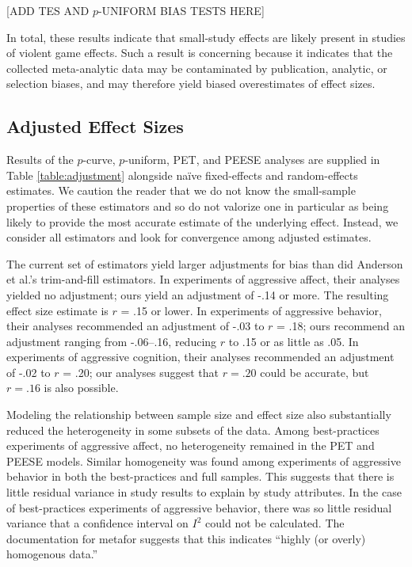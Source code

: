 \documentclass[man, mask]{apa6}
\begin{document}
[ADD TES AND $p$-UNIFORM BIAS TESTS HERE]

In total, these results indicate that small-study effects are likely present in studies of violent game effects. Such a result is concerning because it indicates that the collected meta-analytic data may be contaminated by publication, analytic, or selection biases, and may therefore yield biased overestimates of effect sizes.

\subsection{Adjusted Effect Sizes}
Results of the $p$-curve, $p$-uniform, PET, and PEESE analyses are supplied in Table \ref{table:adjustment} alongside na{\"i}ve fixed-effects and random-effects estimates. We caution the reader that we do not know the small-sample properties of these estimators and so do not valorize one in particular as being likely to provide the most accurate estimate of the underlying effect. Instead, we consider all estimators and look for convergence among adjusted estimates.

The current set of estimators yield larger adjustments for bias than did Anderson et al.'s trim-and-fill estimators.  In experiments of aggressive affect, their analyses yielded no adjustment; ours yield an adjustment of -.14 or more.  The resulting effect size estimate is $r$ = .15 or lower. In experiments of aggressive behavior, their analyses recommended an adjustment of -.03 to $r$ = .18; ours recommend an adjustment ranging from -.06--.16, reducing $r$ to .15 or as little as .05. In experiments of aggressive cognition, their analyses recommended an adjustment of -.02 to $r$ = .20; our analyses suggest that $r = .20$ could be accurate, but $r = .16$ is also possible.   

Modeling the relationship between sample size and effect size also substantially reduced the heterogeneity in some subsets of the data. Among best-practices experiments of aggressive affect, no heterogeneity remained in the PET and PEESE models. Similar homogeneity was found among experiments of aggressive behavior in both the best-practices and full samples. This suggests that there is little residual variance in study results to explain by study attributes. In the case of best-practices experiments of aggressive behavior, there was so little residual variance that a confidence interval on $I^2$ could not be calculated. The documentation for metafor suggests that this indicates ``highly (or overly) homogenous data.'' \citep[, helpfile for confint.rma.uni]{Veichtbauer:2010}
\end{document}
